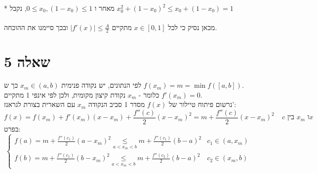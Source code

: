 \documentclass{article}
\newcommand\underrel[2]{\mathrel{\mathop{#2}\limits_{#1}}}
\begin{document}
* מאחר ו $0\leq x_0, (1-x_0) \leq 1$, נקבל $x_0^2+(1-x_0)^2\leq x_0+(1-x_0)=1$
\\\\
מכאן נסיק כי לכל $x\in[0,1]$ מתקיים $|f'(x)|\leq \frac{A}{2}$ ובכך סיימנו את ההוכחה.

\section*{שאלה 5}

לפי הנתונים, יש נקודה פנימית $x_m\in (a,b)$
כך ש $f(x_m)= m =\min f([a,b])$.\\
כלומר - $x_m$ נקודת קיצון מקומית,
ולכן לפי אינפי 1 מתקיים $f'(x_m)=0$.\\
נרשום פיתוח טיילור של $f(x)$ מסדר 1 סביב הנקודה $x_m$ עם השארית בצורת לגראנז':
\[
    f(x)=f(x_m)+f'(x_m)(x-x_m)+\frac{f''(c)}{2}(x-x_m)^2=
    m + \frac{f''(c)}{2}(x-x_m)^2 \;\;\;\; \text{$c$ בין $x_m$ ו$x$}
\]
בפרט:
\[
    \begin{cases}
        f(a)=m+\frac{f''(c_1)}{2}(a-x_m)^2 \underrel{a<x_m<b}{\leq} m+\frac{f''(c_1)}{2}(b-a)^2 & c_1\in (a, x_m) \\
        f(b)=m+\frac{f''(c_1)}{2}(b-x_m)^2 \underrel{a<x_m<b}{\leq} m+\frac{f''(c_2)}{2}(b-a)^2 & c_2\in (x_m, b)
    \end{cases}
\]
\end{document}
